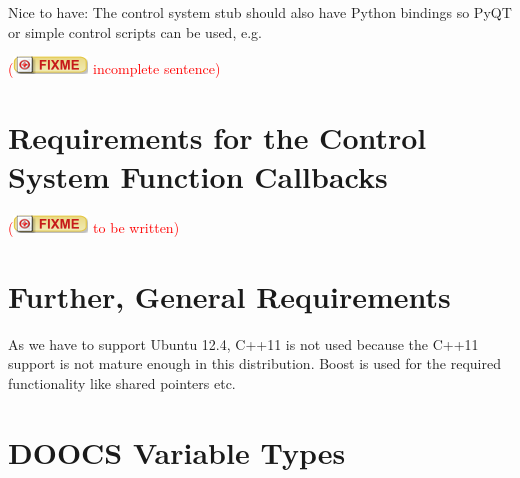 \documentclass[11pt,a4paper]{scrartcl}
\newcounter{nFixmes}
\newcommand{\fixme}[1]{\addtocounter{nFixmes}{1}\textcolor{red}{(\includegraphics[height=2ex]{fixme} #1)}\xspace}
\begin{document}
Nice to have: The control system stub should also have Python bindings so PyQT
or simple control scripts can be used, e.g. \fixme{incomplete sentence}

\section{Requirements for the Control System Function Callbacks}
\label{section_function_callbacks}
\fixme{to be written}

\section{Further, General Requirements}
As we have to support Ubuntu 12.4, C++11 is not used because the C++11 support
is not mature enough in this distribution. Boost is used for the required
functionality like shared pointers etc.

\appendix
\section{DOOCS Variable Types}
\end{document}
